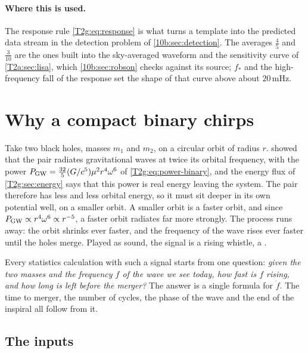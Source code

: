 \paragraph{Where this is used.}
The response rule \eqref{T2g:eq:response} is what turns a template into the predicted data stream in the detection problem of \cref{10b:sec:detection}. The averages $\tfrac45$ and $\tfrac3{10}$ are the ones built into the sky-averaged waveform and the sensitivity curve of \cref{T2a:sec:lisa}, which \cref{10b:sec:robson} checks against its source; $f_*$ and the high-frequency fall of the response set the shape of that curve above about $20$\,mHz.
\section{Why a compact binary chirps}
\label{T2a:sec:chirp}

Take two black holes, masses $m_1$ and $m_2$, on a circular orbit of radius $r$.  showed that the pair radiates gravitational waves at twice its orbital frequency, with the power $P_{\rm GW}=\tfrac{32}{5}(G/c^5)\mu^2r^4\omega^6$ of \eqref{T2g:eq:power-binary}, and the energy flux of \cref{T2g:sec:energy} says that this power is real energy leaving the system. The pair therefore has less and less orbital energy, so it must sit deeper in its own potential well, on a smaller orbit. A smaller orbit is a faster orbit, and since $P_{\rm GW}\propto r^4\omega^6\propto r^{-5}$, a faster orbit radiates far more strongly. The process runs away: the orbit shrinks ever faster, and the frequency of the wave rises ever faster until the holes merge. Played as sound, the signal is a rising whistle, a .

Every statistics calculation with such a signal starts from one question: \emph{given the two masses and the frequency $f$ of the wave we see today, how fast is $f$ rising, and how long is left before the merger?} The answer is a single formula for $\dot f$. The time to merger, the number of cycles, the phase of the wave and the end of the inspiral all follow from it.

\subsection{The inputs}

